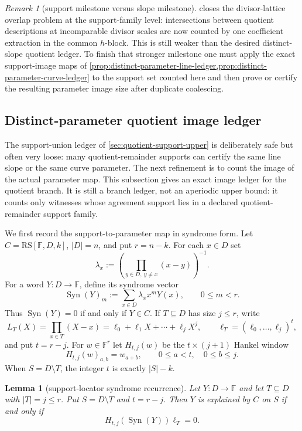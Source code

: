 \documentclass[11pt]{article}
\newtheorem{lemma}[theorem]{Lemma}
\theoremstyle{definition}
\theoremstyle{remark}
\newtheorem{remark}[theorem]{Remark}
\newcommand{\F}{\mathbb{F}}
\newcommand{\RS}{\mathrm{RS}}
\newcommand{\Syn}{\operatorname{Syn}}
\begin{document}
\begin{remark}[support milestone versus slope milestone]
\label{rem:support-vs-slope-milestone}
 closes the divisor-lattice overlap
problem at the support-family level: intersections between quotient descriptions
at incomparable divisor scales are now counted by one coefficient extraction in
the common $h$-block.  This is still weaker than the desired distinct-slope
quotient ledger.  To finish that stronger milestone one must apply the exact
support-image maps of
\cref{prop:distinct-parameter-line-ledger,prop:distinct-parameter-curve-ledger}
to the support set counted here and then prove or certify the resulting parameter
image size after duplicate coalescing.
\end{remark}

\subsection{Distinct-parameter quotient image ledger}
\label{sec:quotient-distinct-parameter}

The support-union ledger of \cref{sec:quotient-support-upper} is deliberately
safe but often very loose: many quotient-remainder supports can certify the same
line slope or the same curve parameter.  The next refinement is to count the
image of the actual parameter map.  This subsection gives an exact image ledger
for the quotient branch.  It is still a branch ledger, not an aperiodic upper
bound: it counts only witnesses whose agreement support lies in a declared
quotient-remainder support family.

We first record the support-to-parameter map in syndrome form.  Let
$C=\RS[\F,D,k]$, $|D|=n$, and put $r=n-k$.  For each $x\in D$ set
\[
        \lambda_x:=\left(\prod_{y\in D,\ y\ne x}(x-y)\right)^{-1}.
\]
For a word $Y:D\to\F$, define its syndrome vector
\[
        \Syn(Y)_m:=\sum_{x\in D}\lambda_x x^mY(x),
        \qquad 0\le m<r .
\]
Thus $\Syn(Y)=0$ if and only if $Y\in C$.  If
$T\subseteq D$ has size $j\le r$, write
\[
        L_T(X)=\prod_{x\in T}(X-x)=\ell_0+\ell_1X+\cdots+\ell_jX^j,
        \qquad
        \boldsymbol\ell_T=(\ell_0,\ldots,\ell_j)^t,
\]
and put $t=r-j$.  For $w\in\F^r$ let $H_{t,j}(w)$ be the $t\times(j+1)$ Hankel
window
\[
        H_{t,j}(w)_{a,b}=w_{a+b},
        \qquad 0\le a<t,\quad 0\le b\le j .
\]
When $S=D\setminus T$, the integer $t$ is exactly $|S|-k$.


\begin{lemma}[support-locator syndrome recurrence]
\label{lem:support-locator-syndrome-recurrence}
Let $Y:D\to\F$ and let $T\subseteq D$ with $|T|=j\le r$.  Put
$S=D\setminus T$ and $t=r-j$.  Then $Y$ is explained by $C$ on $S$ if and only if
\[
        H_{t,j}(\Syn(Y))\boldsymbol\ell_T=0 .
\]
\end{lemma}
\end{document}
